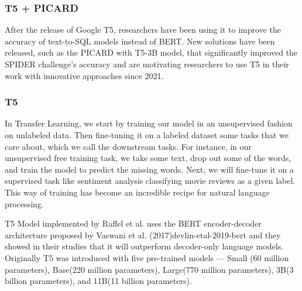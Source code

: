 \subsubsection{T5 + PICARD} \label{picard}


After the release of Google T5, researchers have been using it to improve the accuracy of text-to-SQL models instead of BERT. New solutions have been released, such as the PICARD with T5-3B model, that significantly improved the SPIDER challenge's accuracy and are motivating researchers to use T5 in their work with innovative approaches since 2021.

\subsubsection*{T5}

In Transfer Learning, we start by training our model in an unsupervised fashion on unlabeled data. Then fine-tuning it on a labeled dataset some tasks that we care about, which we call the downstream tasks. For instance, in our unsupervised free training task, we take some text, drop out some of the words, and train the model to predict the missing words. Next, we will fine-tune it on a supervised task like sentiment analysis classifying movie reviews as a given label. This way of training has become an incredible recipe for natural language processing.

\ac{T5} Model implemented by Raffel et al. \cite{raffel_exploring_2020} uses the BERT encoder-decoder architecture proposed by Vaswani et al. (2017){devlin-etal-2019-bert} and they showed in their studies that it will outperform decoder-only language models. Originally T5 was introduced with five pre-trained models — Small (60 million parameters), Base(220 million parameters), Large(770 million parameters), 3B(3 billion parameters), and 11B(11 billion parameters)\cite{raffel_exploring_2020}.


